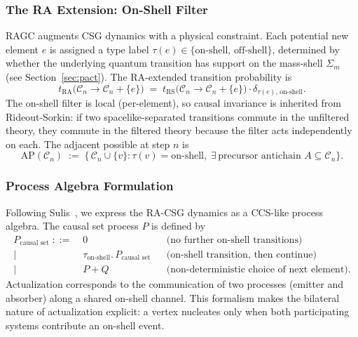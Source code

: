 \documentclass[11pt,a4paper]{article}
\theoremstyle{plain}
\theoremstyle{definition}
\theoremstyle{remark}
\newcommand{\Sigmam}{\Sigma_{m}}
\newcommand{\AP}{\mathrm{AP}}
\begin{document}
\subsubsection{The RA Extension: On-Shell Filter}

RAGC augments CSG dynamics with a physical constraint. Each potential new element
$e$ is assigned a type label $\tau(e) \in \{\text{on-shell},\,\text{off-shell}\}$,
determined by whether the underlying quantum transition has support on the
mass-shell $\Sigmam$ (see Section~\ref{sec:pact}). The RA-extended transition
probability is
\begin{equation}
  t_{\mathrm{RA}}\bigl(\mathcal{C}_{n} \to \mathcal{C}_{n} + \{e\}\bigr)
  \;=\;
  t_{\mathrm{RS}}\bigl(\mathcal{C}_{n} \to \mathcal{C}_{n} + \{e\}\bigr)
  \cdot \delta_{\tau(e),\,\text{on-shell}}.
\end{equation}
The on-shell filter is local (per-element), so causal invariance is inherited from
Rideout-Sorkin: if two spacelike-separated transitions commute in the unfiltered
theory, they commute in the filtered theory because the filter acts independently
on each. The adjacent possible at step $n$ is
\begin{equation}
  \AP(\mathcal{C}_{n})
  \;:=\;
  \bigl\{\, \mathcal{C}_{n} \cup \{v\} :
    \tau(v) = \text{on-shell},\;
    \exists\,\text{precursor antichain } A \subseteq \mathcal{C}_{n}
  \bigr\}.
\end{equation}

\subsubsection{Process Algebra Formulation}

Following Sulis~\citep{Sulis2020}, we express the RA-CSG dynamics as a
CCS-like process algebra. The causal set process $P$ is defined by
\begin{align*}
  P_{\text{causal set}} \;::=\;&
    0 & &\text{(no further on-shell transitions)}\\
    \mid\;& \tau_{\text{on-shell}}.\,P_{\text{causal set}}
            & &\text{(on-shell transition, then continue)}\\
    \mid\;& P + Q
            & &\text{(non-deterministic choice of next element).}
\end{align*}
Actualization corresponds to the communication of two processes (emitter and
absorber) along a shared on-shell channel. This formalism makes the bilateral
nature of actualization explicit: a vertex nucleates only when both participating
systems contribute an on-shell event.
\end{document}
